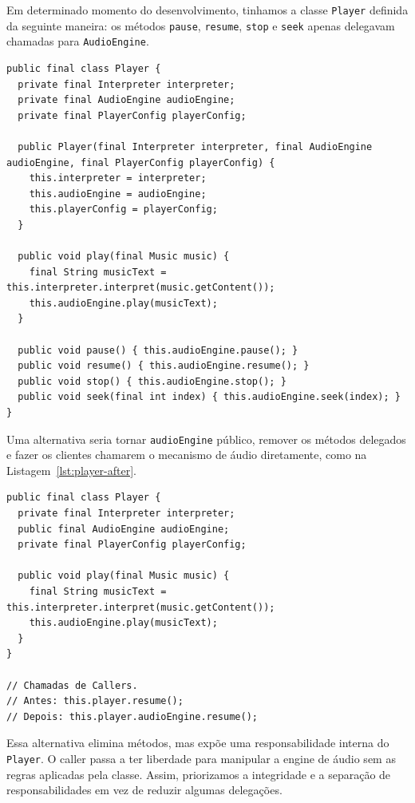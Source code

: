 \documentclass[12pt,a4paper]{article}
\begin{document}
Em determinado momento do desenvolvimento, tinhamos a classe \texttt{Player} definida da seguinte maneira: os métodos \texttt{pause}, \texttt{resume}, \texttt{stop} e \texttt{seek} apenas delegavam chamadas para \texttt{AudioEngine}.

\begin{lstlisting}[caption={Player antes da análise do Middle Man},label={lst:player-before}]
public final class Player {
  private final Interpreter interpreter;
  private final AudioEngine audioEngine;
  private final PlayerConfig playerConfig;

  public Player(final Interpreter interpreter, final AudioEngine audioEngine, final PlayerConfig playerConfig) {
    this.interpreter = interpreter;
    this.audioEngine = audioEngine;
    this.playerConfig = playerConfig;
  }

  public void play(final Music music) {
    final String musicText = this.interpreter.interpret(music.getContent());
    this.audioEngine.play(musicText);
  }

  public void pause() { this.audioEngine.pause(); }
  public void resume() { this.audioEngine.resume(); }
  public void stop() { this.audioEngine.stop(); }
  public void seek(final int index) { this.audioEngine.seek(index); }
}
\end{lstlisting}

Uma alternativa seria tornar \texttt{audioEngine} público, remover os métodos delegados e fazer os clientes chamarem o mecanismo de áudio diretamente, como na Listagem~\ref{lst:player-after}.

\begin{lstlisting}[caption={Alternativa de remoção do Middle Man},label={lst:player-after}]
public final class Player {
  private final Interpreter interpreter;
  public final AudioEngine audioEngine;
  private final PlayerConfig playerConfig;

  public void play(final Music music) {
    final String musicText = this.interpreter.interpret(music.getContent());
    this.audioEngine.play(musicText);
  }
}

// Chamadas de Callers.
// Antes: this.player.resume();
// Depois: this.player.audioEngine.resume();
\end{lstlisting}

Essa alternativa elimina métodos, mas expõe uma responsabilidade interna do \texttt{Player}. O caller passa a ter liberdade para manipular a engine de áudio sem as regras aplicadas pela classe. Assim, priorizamos a integridade e a separação de responsabilidades em vez de reduzir algumas delegações.
\end{document}
